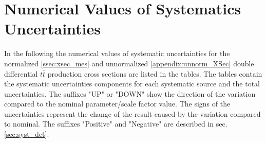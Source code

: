 \chapter{Numerical Values of Systematics Uncertainties}\label{appendix:syst_unnorm}

In the following the numerical values of systematic uncertainties for the normalized \ref{ssec:xsec_mes} and unnormalized \ref{appendix:unnorm_XSec}
double differential $t\bar{t}$ production cross sections 
are listed in the tables. The tables contain the systematic uncertainties components for each systematic source
and the total uncertainties. The suffixes "UP" or "DOWN" show the direction of the variation compared to the nominal
parameter/scale factor value. The signs of the uncertainties represent the change of the result caused by the variation
compared to nominal. The suffixes "Positive" and "Negative" are described in sec. \ref{sec:syst_det}.

% 
% 

% 


% 



% 


% 


% 

